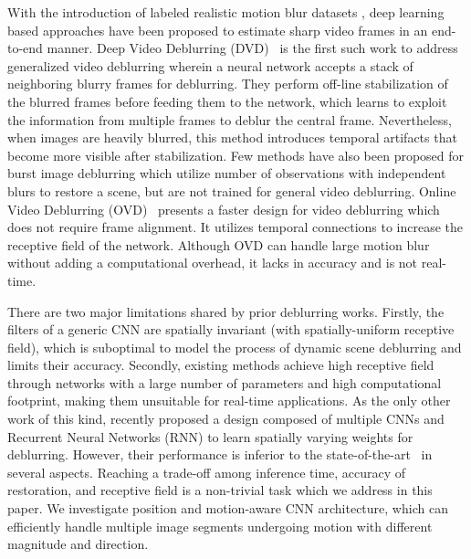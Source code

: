 \documentclass[10pt,twocolumn,letterpaper]{article}
\begin{document}
With the introduction of labeled realistic motion blur datasets \cite{su2017deep}, deep learning based approaches have been proposed to estimate sharp video frames in an end-to-end manner. Deep Video Deblurring (DVD)~\cite{su2017deep} is the first such work to address generalized video deblurring wherein a neural network accepts a stack of neighboring blurry frames for deblurring. They perform off-line stabilization of the blurred frames before feeding them to the network, which learns to exploit the information from multiple frames to deblur the central frame. Nevertheless, when images are heavily blurred, this method introduces temporal artifacts that become more visible after stabilization. Few methods have also been proposed for burst image deblurring \cite{wieschollek2017learning,aittala2018burst} which utilize number of observations with independent blurs to restore a scene, but are not trained for general video deblurring. Online Video Deblurring (OVD)~\cite{hyun2017online} presents a faster design for video deblurring which does not require frame alignment. It utilizes temporal connections to increase the receptive field of the network. Although OVD can handle large motion blur without adding a computational overhead, it lacks in accuracy and is not real-time.


There are two major limitations shared by prior deblurring works. Firstly, the filters of a generic CNN are spatially invariant (with spatially-uniform receptive field), which is suboptimal to model the process of dynamic scene deblurring and limits their accuracy. Secondly, existing methods achieve high receptive field through networks with a large number of parameters and high computational footprint, making them unsuitable for real-time applications. As the only other work of this kind, \cite{zhang2018dynamic} recently proposed a design composed of multiple CNNs and Recurrent Neural Networks (RNN) to learn spatially varying weights for deblurring. However, their performance is inferior to the state-of-the-art~\cite{tao2018scale} in several aspects. Reaching a trade-off among inference time, accuracy of restoration, and receptive field is a non-trivial task which we address in this paper. We investigate position and motion-aware CNN architecture, which can efficiently handle multiple image segments undergoing motion with different magnitude and direction. 
\end{document}
